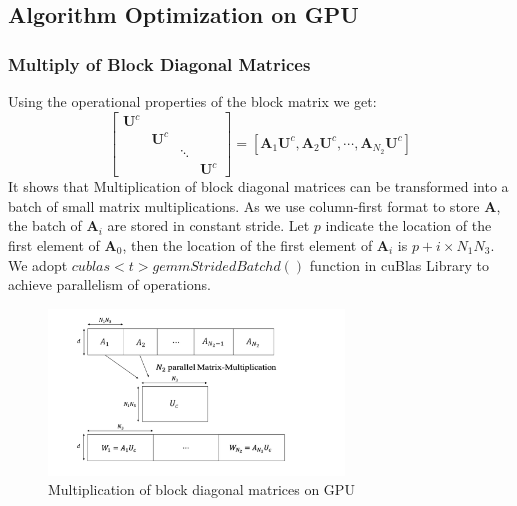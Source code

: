 \documentclass[journal,article,submit,moreauthors,pdftex,10pt,a4paper]{Definitions/mdpi}
\theoremstyle{plain}
\theoremstyle{definition}
\theoremstyle{remark}
\begin{document}
\subsection{Algorithm Optimization on GPU}
\subsubsection{Multiply of Block Diagonal Matrices}
Using the operational properties of the block matrix we get:
\begin{equation}
        [\mathbf{A}_1, \mathbf{A}_2, \cdots, \mathbf{A}_{N_2}]
        \begin{bmatrix}
            \mathbf{U}^c & & & \\
            & \mathbf{U}^c & & \\
            & & \ddots & \\
            & & & \mathbf{U}^c
        \end{bmatrix}
        =
        [\mathbf{A}_1\mathbf{U}^c, \mathbf{A}_2\mathbf{U}^c, \cdots, \mathbf{A}_{N_2}\mathbf{U}^c]
\label{step1}
\end{equation}
It shows that Multiplication of block diagonal matrices can be transformed into a batch of small matrix multiplications. 
As we use column-first format to store $\mathbf{A}$, the batch of $\mathbf{A}_i$ are stored in constant stride. Let $p$ indicate the location of the first element of $\mathbf{A}_0$, then the location of the first element of $\mathbf{A}_i$ is $p+i\times N_1N_3$.  We adopt $cublas<t>gemmStridedBatchd()$ function in cuBlas Library to achieve parallelism of operations.
\begin{figure}[H]
\centering
\includegraphics[width=0.7\textwidth]{diagMM.pdf}
\caption{Multiplication of block diagonal matrices on GPU}
\label{Fig:diagMM}
\end{figure}
\end{document}
